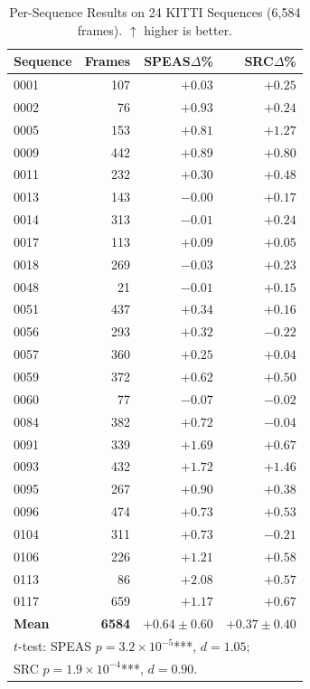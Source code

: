 \documentclass[conference]{IEEEtran}
\begin{document}
\begin{table}[t]
\centering
\caption{Per-Sequence Results on 24 KITTI Sequences
(6{,}584 frames). $\uparrow$ higher is better.}
\label{tab:main}
\setlength{\tabcolsep}{4pt}
\begin{tabular}{lrrr}
\toprule
Sequence & Frames & SPEAS$\Delta$\% & SRC$\Delta$\% \\
\midrule
0001 &  107 & $+0.03$ & $+0.25$ \\
0002 &   76 & $+0.93$ & $+0.24$ \\
0005 &  153 & $+0.81$ & $+1.27$ \\
0009 &  442 & $+0.89$ & $+0.80$ \\
0011 &  232 & $+0.30$ & $+0.48$ \\
0013 &  143 & $-0.00$ & $+0.17$ \\
0014 &  313 & $-0.01$ & $+0.24$ \\
0017 &  113 & $+0.09$ & $+0.05$ \\
0018 &  269 & $-0.03$ & $+0.23$ \\
0048 &   21 & $-0.01$ & $+0.15$ \\
0051 &  437 & $+0.34$ & $+0.16$ \\
0056 &  293 & $+0.32$ & $-0.22$ \\
0057 &  360 & $+0.25$ & $+0.04$ \\
0059 &  372 & $+0.62$ & $+0.50$ \\
0060 &   77 & $-0.07$ & $-0.02$ \\
0084 &  382 & $+0.72$ & $-0.04$ \\
0091 &  339 & $+1.69$ & $+0.67$ \\
0093 &  432 & $+1.72$ & $+1.46$ \\
0095 &  267 & $+0.90$ & $+0.38$ \\
0096 &  474 & $+0.73$ & $+0.53$ \\
0104 &  311 & $+0.73$ & $-0.21$ \\
0106 &  226 & $+1.21$ & $+0.58$ \\
0113 &   86 & $+2.08$ & $+0.57$ \\
0117 &  659 & $+1.17$ & $+0.67$ \\
\midrule
\textbf{Mean} & \textbf{6584} &
  $\mathbf{+0.64{\pm}0.60}$ & $\mathbf{+0.37{\pm}0.40}$ \\
\bottomrule
\multicolumn{4}{l}{\footnotesize $t$-test: SPEAS
  $p{=}3.2{\times}10^{-5}${***}, $d{=}1.05$;} \\
\multicolumn{4}{l}{\footnotesize SRC
  $p{=}1.9{\times}10^{-4}${***}, $d{=}0.90$.} \\
\end{tabular}
\end{table}
\end{document}
